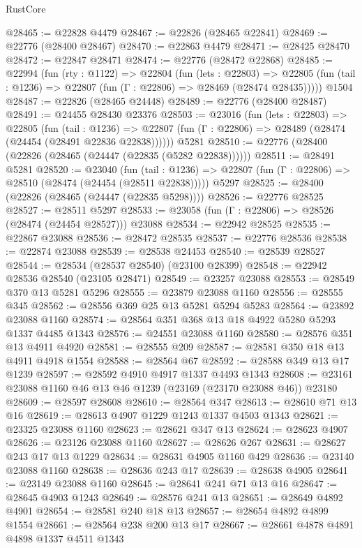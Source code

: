 \begin{lexlean}{RustCore}
\begin{coremodule}
@28465 := @22828 @4479
@28467 := @22826 (@28465 @22841)
@28469 := @22776 (@28400 @28467)
@28470 := @22863 @4479
@28471 := @28425 @28470
@28472 := @22847 @28471
@28474 := @22776 (@28472 @22868)
@28485 := @22994
    (fun (rty : @1122) =>
    @22804
      (fun (lets : @22803) =>
      @22805 (fun (tail : @1236) => @22807 (fun (Γ : @22806) => @28469 (@28474 @28435)))))
    @1504
@28487 := @22826 (@28465 @24448)
@28489 := @22776 (@28400 @28487)
@28491 := @24455 @28430 @23376
@28503 := @23016
    (fun (lets : @22803) =>
    @22805
      (fun (tail : @1236) =>
      @22807 (fun (Γ : @22806) => @28489 (@28474 (@24454 (@28491 @22836 @22838))))))
    @5281
@28510 := @22776 (@28400 (@22826 (@28465 (@24447 (@22835 (@5282 @22838))))))
@28511 := @28491 @5281
@28520 := @23040
    (fun (tail : @1236) => @22807 (fun (Γ : @22806) => @28510 (@28474 (@24454 (@28511 @22838)))))
    @5297
@28525 := @28400 (@22826 (@28465 (@24447 (@22835 @5298))))
@28526 := @22776 @28525
@28527 := @28511 @5297
@28533 := @23058 (fun (Γ : @22806) => @28526 (@28474 (@24454 @28527))) @23088
@28534 := @22942 @28525
@28535 := @22867 @23088
@28536 := @28472 @28535
@28537 := @22776 @28536
@28538 := @22874 @23088
@28539 := @28538 @24453
@28540 := @28539 @28527
@28544 := @28534 (@28537 @28540) (@23100 @28399)
@28548 := @22942 @28536 @28540 (@23105 @28471)
@28549 := @23257 @23088
@28553 := @28549 @370 @13 @5281 @5296
@28555 := @23879 @23088 @1160
@28556 := @28555 @345
@28562 := @28556 @369 @25 @13 @5281 @5294 @5283
@28564 := @23892 @23088 @1160
@28574 := @28564 @351 @368 @13 @18 @4922 @5280 @5293 @1337 @4485 @1343
@28576 := @24551 @23088 @1160
@28580 := @28576 @351 @13 @4911 @4920
@28581 := @28555 @209
@28587 := @28581 @350 @18 @13 @4911 @4918 @1554
@28588 := @28564 @67
@28592 := @28588 @349 @13 @17 @1239
@28597 := @28592 @4910 @4917 @1337 @4493 @1343
@28608 := @23161 @23088 @1160 @46 @13 @46 @1239 (@23169 (@23170 @23088 @46)) @23180
@28609 := @28597 @28608
@28610 := @28564 @347
@28613 := @28610 @71 @13 @16
@28619 := @28613 @4907 @1229 @1243 @1337 @4503 @1343
@28621 := @23325 @23088 @1160
@28623 := @28621 @347 @13
@28624 := @28623 @4907
@28626 := @23126 @23088 @1160
@28627 := @28626 @267
@28631 := @28627 @243 @17 @13 @1229
@28634 := @28631 @4905 @1160 @429
@28636 := @23140 @23088 @1160
@28638 := @28636 @243 @17
@28639 := @28638 @4905
@28641 := @23149 @23088 @1160
@28645 := @28641 @241 @71 @13 @16
@28647 := @28645 @4903 @1243
@28649 := @28576 @241 @13
@28651 := @28649 @4892 @4901
@28654 := @28581 @240 @18 @13
@28657 := @28654 @4892 @4899 @1554
@28661 := @28564 @238 @200 @13 @17
@28667 := @28661 @4878 @4891 @4898 @1337 @4511 @1343

\end{coremodule}
\end{lexlean}
